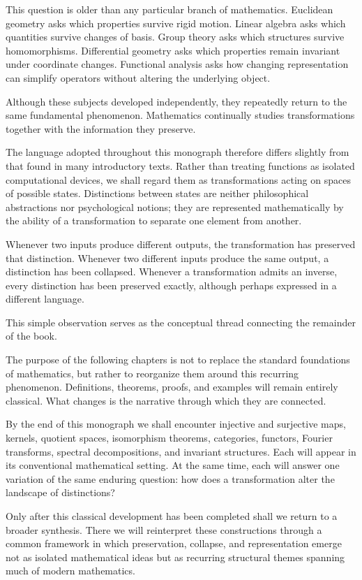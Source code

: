 \documentclass[11pt]{book}
\numberwithin{equation}{chapter}
\theoremstyle{definition}
\theoremstyle{plain}
\theoremstyle{remark}
\begin{document}
This question is older than any particular branch of mathematics. Euclidean geometry asks which properties survive rigid motion. Linear algebra asks which quantities survive changes of basis. Group theory asks which structures survive homomorphisms. Differential geometry asks which properties remain invariant under coordinate changes. Functional analysis asks how changing representation can simplify operators without altering the underlying object.

Although these subjects developed independently, they repeatedly return to the same fundamental phenomenon. Mathematics continually studies transformations together with the information they preserve.

The language adopted throughout this monograph therefore differs slightly from that found in many introductory texts. Rather than treating functions as isolated computational devices, we shall regard them as transformations acting on spaces of possible states. Distinctions between states are neither philosophical abstractions nor psychological notions; they are represented mathematically by the ability of a transformation to separate one element from another.

Whenever two inputs produce different outputs, the transformation has preserved that distinction. Whenever two different inputs produce the same output, a distinction has been collapsed. Whenever a transformation admits an inverse, every distinction has been preserved exactly, although perhaps expressed in a different language.

This simple observation serves as the conceptual thread connecting the remainder of the book.

The purpose of the following chapters is not to replace the standard foundations of mathematics, but rather to reorganize them around this recurring phenomenon. Definitions, theorems, proofs, and examples will remain entirely classical. What changes is the narrative through which they are connected.

By the end of this monograph we shall encounter injective and surjective maps, kernels, quotient spaces, isomorphism theorems, categories, functors, Fourier transforms, spectral decompositions, and invariant structures. Each will appear in its conventional mathematical setting. At the same time, each will answer one variation of the same enduring question: how does a transformation alter the landscape of distinctions?

Only after this classical development has been completed shall we return to a broader synthesis. There we will reinterpret these constructions through a common framework in which preservation, collapse, and representation emerge not as isolated mathematical ideas but as recurring structural themes spanning much of modern mathematics.
\end{document}
